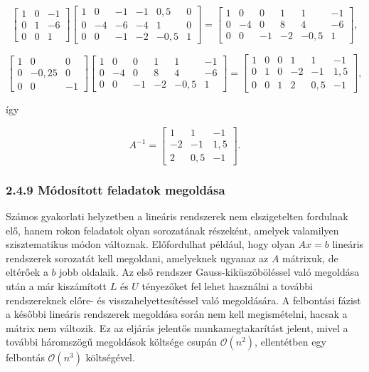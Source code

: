 \documentclass[
  magyar,
  11pt]{article}
\begin{document}
\[\begin{bmatrix} 1 & 0 & -1 \\ 0 & 1 & -6 \\ 0 & 0 & 1 \end{bmatrix} \begin{bmatrix} 1 & 0 & -1 & -1 & 0{,}5 & 0 \\ 0 & -4 & -6 & -4 & 1 & 0 \\ 0 & 0 & -1 & -2 & -0{,}5 & 1 \end{bmatrix} = \begin{bmatrix} 1 & 0 & 0 & 1 & 1 & -1 \\ 0 & -4 & 0 & 8 & 4 & -6 \\ 0 & 0 & -1 & -2 & -0{,}5 & 1 \end{bmatrix},\]

\[\begin{bmatrix} 1 & 0 & 0 \\ 0 & -0{,}25 & 0 \\ 0 & 0 & -1 \end{bmatrix} \begin{bmatrix} 1 & 0 & 0 & 1 & 1 & -1 \\ 0 & -4 & 0 & 8 & 4 & -6 \\ 0 & 0 & -1 & -2 & -0{,}5 & 1 \end{bmatrix} = \begin{bmatrix} 1 & 0 & 0 & 1 & 1 & -1 \\ 0 & 1 & 0 & -2 & -1 & 1{,}5 \\ 0 & 0 & 1 & 2 & 0{,}5 & -1 \end{bmatrix},\]

így

\[A^{-1} = \begin{bmatrix} 1 & 1 & -1 \\ -2 & -1 & 1{,}5 \\ 2 & 0{,}5 & -1 \end{bmatrix}.\]

\subsubsection{2.4.9 Módosított feladatok
megoldása}\label{muxf3dosuxedtott-feladatok-megolduxe1sa}

Számos gyakorlati helyzetben a lineáris rendszerek nem elszigetelten
fordulnak elő, hanem rokon feladatok olyan sorozatának részeként,
amelyek valamilyen szisztematikus módon változnak. Előfordulhat például,
hogy olyan \(Ax = b\) lineáris rendszerek sorozatát kell megoldani,
amelyeknek ugyanaz az \(A\) mátrixuk, de eltérőek a \(b\) jobb oldalaik.
Az első rendszer Gauss-kiküszöböléssel való megoldása után a már
kiszámított \(L\) és \(U\) tényezőket fel lehet használni a további
rendszereknek előre- és visszahelyettesítéssel való megoldására. A
felbontási fázist a későbbi lineáris rendszerek megoldása során nem kell
megismételni, hacsak a mátrix nem változik. Ez az eljárás jelentős
munkamegtakarítást jelent, mivel a további háromszögű megoldások
költsége csupán \(\mathcal{O}(n^2)\), ellentétben egy felbontás
\(\mathcal{O}(n^3)\) költségével.
\end{document}
